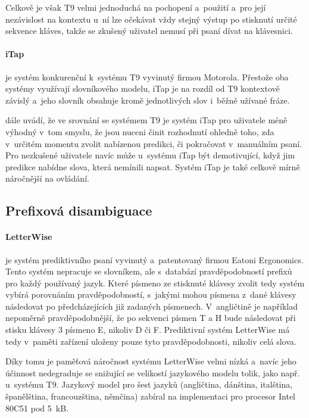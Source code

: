 \documentclass[a4paper,11pt,openany]{book} %
\newcommand\exmp{\textsf}
\begin{document}
Celkově je však T9 velmi jednoduchá na pochopení a~použití a~pro její nezávislost na kontextu u~ní lze očekávat vždy stejný výstup po stisknutí určité sekvence kláves, takže se zkušený uživatel nemusí při psaní dívat na klávesnici. \parencite{davidmackay}

\paragraph{iTap}
je systém konkurenční k~systému T9 vyvinutý firmou Motorola. Přestože oba systémy využívají slovníkového modelu, iTap je na rozdíl od T9 kontextově závislý a~jeho slovník obsahuje kromě jednotlivých slov i~běžně užívané fráze. 

\parencite{davidmackay} dále uvádí, že ve srovnání se systémem T9 je systém iTap pro uživatele méně výhodný v~tom smyslu, že jsou nuceni činit rozhodnutí ohledně toho, zda v~určitém momentu zvolit nabízenou predikci, či pokračovat v~manuálním psaní. Pro nezkušené uživatele navíc může u~systému iTap být demotivující, když jim predikce nabídne slova, která nemínili napsat. Systém iTap je také celkově mírně náročnější na ovládání.

\subsection{Prefixová disambiguace}

\paragraph{LetterWise}

je systém prediktivního psaní vyvinutý a~patentovaný firmou Eatoni Ergonomics. Tento systém nepracuje se slovníkem, ale s~databází pravděpodobností prefixů pro každý používaný jazyk. Které písmeno ze stisknuté klávesy zvolit tedy systém vybírá porovnáním pravděpodobností, s~jakými mohou písmena z~dané klávesy následovat po předcházejících již zadaných písmenech. V~angličtině je například nepoměrně pravděpodobnější, že po sekvenci písmen \exmp{T} a \exmp{H} bude následovat při stisku klávesy \exmp{3} písmeno \exmp{E}, nikoliv \exmp{D} či \exmp{F}. Prediktivní systém LetterWise má tedy v~paměti zařízení uloženy pouze tyto pravděpodobnosti, nikoliv celá slova. \parencite{MacKenzie2001}

Díky tomu je paměťová náročnost systému LetterWise velmi nízká a~navíc jeho účinnost nedegraduje se snižující se velikostí jazykového modelu tolik, jako např. u~systému T9. Jazykový model pro šest jazyků (angličtina, dánština, italština, španělština, francouzština, němčina) zabíral na implementaci pro procesor Intel 80C51 pod 5~kB. \parencite{eatoniletterwisereq} %
\end{document}

